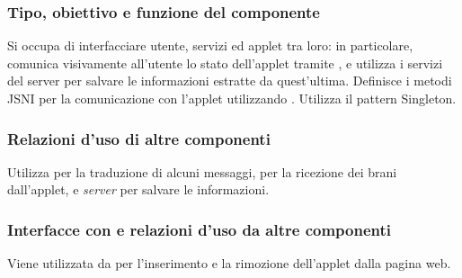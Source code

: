 \subsubsection*{Tipo, obiettivo e funzione del componente}
Si occupa di interfacciare utente, servizi ed applet tra loro: in particolare,
comunica visivamente all'utente lo stato dell'applet tramite ,
e utilizza i servizi del server per salvare le informazioni estratte da quest'ultima.
Definisce i metodi JSNI per la comunicazione con l'applet utilizzando
. Utilizza il pattern Singleton.
\subsubsection*{Relazioni d'uso di altre componenti}
Utilizza  per la traduzione di alcuni messaggi,
 per la ricezione dei brani dall'applet, e \emph{server} per
salvare le informazioni.
\subsubsection*{Interfacce con e relazioni d'uso da altre componenti}
Viene utilizzata da  per l'inserimento e la rimozione
dell'applet dalla pagina web.
